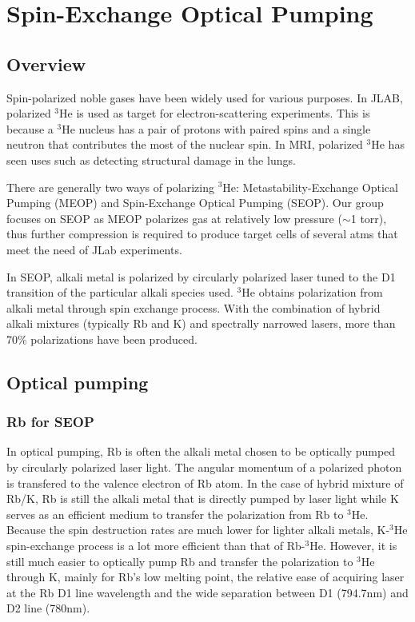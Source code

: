 \chapter{Spin-Exchange Optical Pumping}
\label{chap2}

\section{Overview}

Spin-polarized noble gases have been widely used for various purposes. In JLAB, polarized $^{3}$He is used as target for electron-scattering experiments. This is because a $^{3}$He nucleus has a pair of protons with paired spins and a single neutron that contributes the most of the nuclear spin. In MRI, polarized $^{3}$He has seen uses such as detecting structural damage in the lungs.

There are generally two ways of polarizing $^{3}$He: Metastability-Exchange Optical Pumping (MEOP) and Spin-Exchange Optical Pumping (SEOP). Our group focuses on SEOP as MEOP polarizes gas at relatively low pressure ($\sim$1 torr), thus further compression is required to produce target cells of several atms that meet the need of JLab experiments.

In SEOP, alkali metal is polarized by circularly polarized laser tuned to the D1 transition of the particular alkali species used. $^{3}$He obtains polarization from alkali metal through spin exchange process. With the combination of hybrid alkali mixtures (typically Rb and K) and spectrally narrowed lasers, more than 70\% polarizations have been produced.

\section{Optical pumping}

\subsection{Rb for SEOP}

In optical pumping, Rb is often the alkali metal chosen to be optically pumped by circularly polarized laser light. The angular momentum of a polarized photon is transfered to the valence electron of Rb atom. In the case of hybrid mixture of Rb/K, Rb is still the alkali metal that is directly pumped by laser light while K serves as an efficient medium to transfer the polarization from Rb to $^{3}$He. Because the spin destruction rates are much lower for lighter alkali metals, K-$^{3}$He spin-exchange process is a lot more efficient than that of Rb-$^{3}$He. However, it is still much easier to optically pump Rb and transfer the polarization to $^{3}$He through K, mainly for Rb's low melting point, the relative ease of acquiring laser at the Rb D1 line wavelength and the wide separation between D1 (794.7nm) and D2 line (780nm). 

